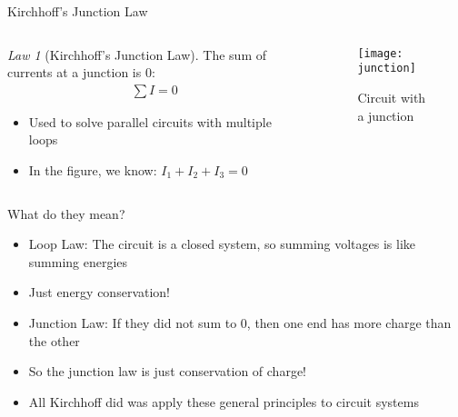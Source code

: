 \documentclass{beamer}
\theoremstyle{remark}
\newtheorem{law}{Law}
\begin{document}
\begin{frame}{Kirchhoff's Junction Law}
  \begin{columns}
    \begin{column}{0.6\textwidth}
      \begin{law}[Kirchhoff's Junction Law]
        The sum of currents at a junction is 0:
        \begin{align*}
          \sum I=0
        \end{align*}
      \end{law}
      \begin{itemize}
      \item Used to solve parallel circuits with multiple loops
      \item In the figure, we know: $I_1+I_2+I_3=0$
      \end{itemize}
    \end{column}
    \begin{column}{0.4\textwidth}
      \begin{figure}[H]
        \centering
        \texttt{[image: junction]}
        \caption{Circuit with a junction}
      \end{figure}
    \end{column}
  \end{columns}
\end{frame}

\begin{frame}{What do they mean?}
  \begin{itemize}
  \item Loop Law: The circuit is a closed system, so summing voltages is like summing energies
  \item Just energy conservation!
  \item Junction Law: If they did not sum to $0$, then one end has more charge than the other
  \item So the junction law is just conservation of charge!
  \item All Kirchhoff did was apply these general principles to circuit systems
  \end{itemize}
\end{frame}
\end{document}
